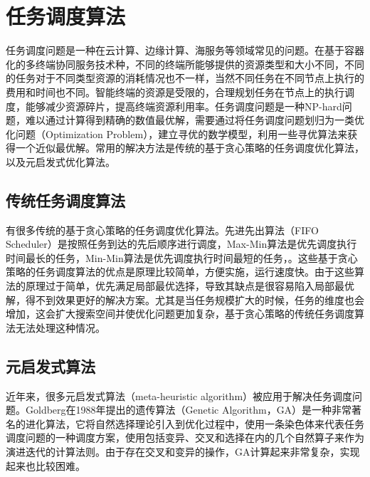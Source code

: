 \section{任务调度算法}\label{sec:related_work_task_scheduling}
任务调度问题是一种在云计算\cite{qiao2016efficient}、边缘计算\cite{guo2017energy}、海服务\cite{王劲林2015一种现场}等领域常见的问题。在基于容器化的多终端协同服务技术种，不同的终端所能够提供的资源类型和大小不同，不同的任务对于不同类型资源的消耗情况也不一样，当然不同任务在不同节点上执行的费用和时间也不同。智能终端的资源是受限的，合理规划任务在节点上的执行调度，能够减少资源碎片，提高终端资源利用率\cite{huang2013energy,tseng2014effective,马晓光2017一种适用于}。任务调度问题是一种NP-hard问题\cite{tawfeek2013cloud}，难以通过计算得到精确的数值最优解，需要通过将任务调度问题划归为一类优化问题（Optimization Problem），建立寻优的数学模型，利用一些寻优算法来获得一个近似最优解。常用的解决方法是传统的基于贪心策略的任务调度优化算法，以及元启发式优化算法。

\subsection{传统任务调度算法}

有很多传统的基于贪心策略的任务调度优化算法\cite{乔楠楠2017一种面向网络边缘任务调度问题的多方向粒子群优化算法}。先进先出算法（FIFO Scheduler）是按照任务到达的先后顺序进行调度\cite{zaharia2009job}，Max-Min算法是优先调度执行时间最长的任务，Min-Min算法是优先调度执行时间最短的任务，\cite{tabak2014improving,杜玉霞2010Min}。这些基于贪心策略的任务调度算法的优点是原理比较简单，方便实施，运行速度快。由于这些算法的原理过于简单，优先满足局部最优选择，导致其缺点是很容易陷入局部最优解，得不到效果更好的解决方案。尤其是当任务规模扩大的时候，任务的维度也会增加，这会扩大搜索空间并使优化问题更加复杂，基于贪心策略的传统任务调度算法无法处理这种情况。

\subsection{元启发式算法}

近年来，很多元启发式算法（meta-heuristic algorithm）被应用于解决任务调度问题\cite{al2015cloudlet,刘运2015基于高斯变异的人工萤火虫算法在云计算资源调度中的研究}。Goldberg在1988年提出的遗传算法（Genetic Algorithm，GA）是一种非常著名的进化算法，它将自然选择理论引入到优化过程中，使用一条染色体来代表任务调度问题的一种调度方案，使用包括变异、交叉和选择在内的几个自然算子来作为演进迭代的计算法则\cite{fonseca1995overview,whitley1994genetic}。由于存在交叉和变异的操作，GA计算起来非常复杂，实现起来也比较困难。

